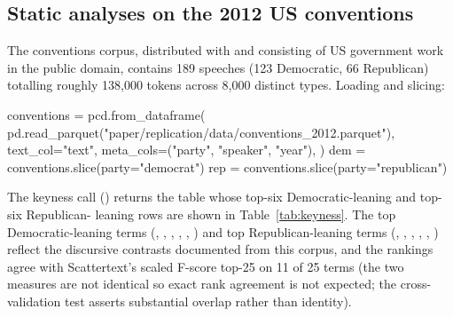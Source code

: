 \documentclass[codesnippet]{jss}
\begin{document}
\subsection{Static analyses on the 2012 US conventions}

The conventions corpus, distributed with 
\citep{kessler2017scattertext} and consisting of US government
work in the public domain, contains 189 speeches (123
Democratic, 66 Republican) totalling roughly 138{,}000 tokens
across 8{,}000 distinct types. Loading and slicing:
\begin{CodeChunk}
\begin{CodeInput}
conventions = pcd.from_dataframe(
    pd.read_parquet("paper/replication/data/conventions_2012.parquet"),
    text_col="text",
    meta_cols=("party", "speaker", "year"),
)
dem = conventions.slice(party="democrat")
rep = conventions.slice(party="republican")
\end{CodeInput}
\end{CodeChunk}

The keyness call () returns
the table whose top-six Democratic-leaning and top-six Republican-
leaning rows are shown in Table~\ref{tab:keyness}. The top
Democratic-leaning terms (, ,
, , , ) and
top Republican-leaning terms (, ,
, , , )
reflect the discursive contrasts \citet{kessler2017scattertext}
documented from this corpus, and the rankings agree with
Scattertext's scaled F-score top-25 on 11 of 25 terms (the two
measures are not identical so exact rank agreement is not
expected; the cross-validation test asserts substantial overlap
rather than identity).
\end{document}

